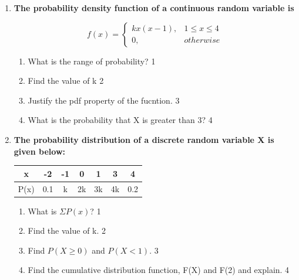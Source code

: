 \documentclass[a4paper,oneside]{book}
\begin{document}
\begin{enumerate}
$$
  f(x) =
\begin{cases}
k(x+1),  & 0 \le x \le 1 \\
0, & otherwise
\end{cases}
$$

  \begin{enumerate}
    \item
	What is a random variable? \hfill 1
    \item
    	Find the value of k \hfill 2
    \item
    	Find the probability that the values of x would lie between 0 and 0.5. \hfill 3
     \item
     	What is the probability that X is greater than 0.8?  \hfill 4
  \end{enumerate}
  
    \item
  \textbf{The probability density function of a continuous random variable is}

$$
  f(x) =
\begin{cases}
kx(x-1),  & 1 \le x \le 4 \\
0, & otherwise
\end{cases}
$$

  \begin{enumerate}
    \item
	What is the range of probability? \hfill 1
    \item
    	Find the value of k \hfill 2
    \item
    	Justify the pdf property of the fucntion. \hfill 3
     \item
     	What is the probability that X is greater than 3?  \hfill 4
  \end{enumerate}


 \item
	  \textbf{The probability distribution of a discrete random variable X is given below:} 

	  \begin{table}[h]
	  \begin{center}
\begin{tabular}{c|cccccc}
x    & -2   & -1 & 0   & 1 & 3 & 4   \\ \hline
P(x) & 0.1 & k & 2k & 3k & 4k & 0.2
\end{tabular} 
\end{center}	
\end{table}
  
  \begin{enumerate}
    \item
	What is $\Sigma P(x)$? \hfill 1
    \item
	Find the value of k. \hfill 2
    \item  
	Find $P(X \geq 0)$ and $P(X < 1)$. \hfill 3
    \item
	Find the cumulative distribution function, F(X) and F(2) and explain. \hfill 4
  \end{enumerate}


\end{enumerate}
\end{document}

